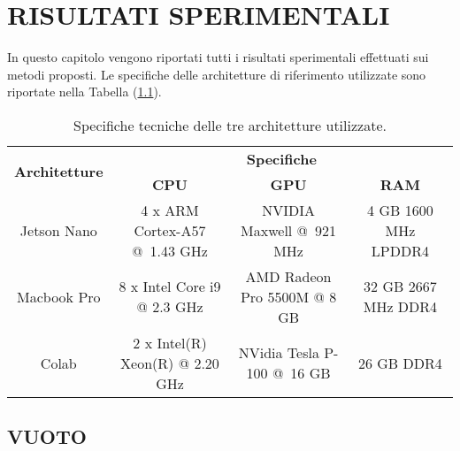 
\chapter{RISULTATI SPERIMENTALI}
\label{Capitolo4}
\thispagestyle{empty}
In questo capitolo vengono riportati tutti i risultati sperimentali effettuati 
sui metodi proposti. Le specifiche delle architetture di riferimento utilizzate 
sono riportate nella Tabella (\ref{specifiche}).
\begin{table}[htbp]
    \centering
    \begin{adjustbox}{max width=\textwidth}
    \begin{tabular}{|c||c|c|c||}
        \hline
        \multirow{2}{*}{\bfseries{Architetture}} & \multicolumn{3}{c||}{\bfseries{Specifiche}}\\            & \bfseries{CPU} & \bfseries{GPU} & \bfseries{RAM}\\
        \hline
        \hline
        Jetson Nano & 4 x ARM Cortex-A57 @ 1.43 GHz & NVIDIA Maxwell @ 921 MHz & 4 GB 1600 MHz LPDDR4\\
        \hline
        Macbook Pro & 8 x Intel Core i9 @ 2.3 GHz & AMD Radeon Pro 5500M @ 8 GB & 32 GB 2667 MHz DDR4\\
        \hline 
        Colab & 2 x Intel(R) Xeon(R) @ 2.20 GHz & NVidia Tesla P-100 @ 16 GB & 26 GB DDR4\\
        \hline
    \end{tabular}
    \end{adjustbox}
    \caption{Specifiche tecniche delle tre architetture utilizzate.}
    \label{specifiche}
\end{table}

\section{VUOTO}